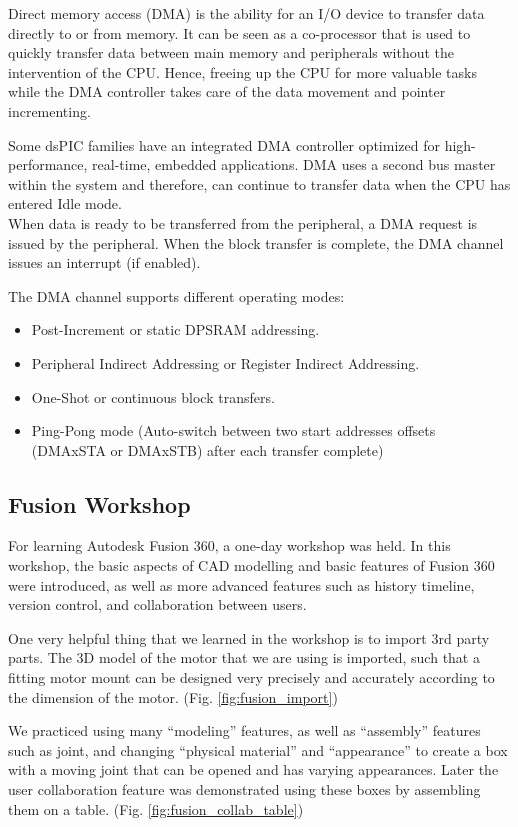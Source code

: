 Direct memory access (DMA) is the ability for an I/O device to transfer data directly to or from memory.  It can be seen as a co-processor that is used to quickly transfer data between main memory and peripherals without the intervention of the CPU. Hence, freeing up the CPU for more valuable tasks while the DMA controller takes care of the data movement and pointer incrementing.

Some dsPIC families have an integrated DMA controller optimized for high-performance, real-time, embedded applications. DMA uses a second bus master within the system and therefore, can continue to transfer data when the CPU has entered Idle mode.\\
When data is ready to be transferred from the peripheral, a DMA request is issued by the peripheral. When the block transfer is complete, the DMA channel issues an interrupt (if enabled).

The DMA channel supports different operating modes:
\begin{itemize}
    \item Post-Increment or static DPSRAM addressing.
    \item Peripheral Indirect Addressing or Register Indirect Addressing.
    \item One-Shot or continuous block transfers.
    \item Ping-Pong mode (Auto-switch between two start addresses offsets (DMAxSTA or DMAxSTB) after each transfer complete)
\end{itemize}




\subsection{Fusion Workshop}
For learning Autodesk Fusion 360, a one-day workshop was held. In this workshop, the basic aspects of CAD modelling and basic features of Fusion 360 were introduced, as well as more advanced features such as history timeline, version control, and collaboration between users.

One very helpful thing that we learned in the workshop is to import 3rd party parts. The 3D model of the motor that we are using is imported, such that a fitting motor mount can be designed very precisely and accurately according to the dimension of the motor. (Fig. \ref{fig:fusion_import})

We practiced using many “modeling” features, as well as “assembly” features such as joint, and changing “physical material” and “appearance” to create a box with a moving joint that can be opened and has varying appearances. Later the user collaboration feature was demonstrated using these boxes by assembling them on a table. (Fig. \ref{fig:fusion_collab_table})

